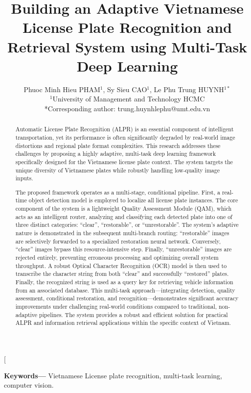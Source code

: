 \documentclass[a4paper,11pt,twocolumn]{article}
\title{\bfseries Building an Adaptive Vietnamese License Plate Recognition and Retrieval System using Multi-Task Deep Learning}
\author{
	Phuoc Minh Hieu PHAM$^{1}$, Sy Sieu CAO$^{1}$, Le Phu Trung HUYNH$^{1*}$\\
	$^{1}$University of Management and Technology HCMC\\[4pt]
	*Corresponding author: trung.huynhlephu@umt.edu.vn
}
\date{}
\begin{document}
	
	\twocolumn[
	\maketitle
	
	\begin{abstract}
		Automatic License Plate Recognition (ALPR) is an essential component of intelligent transportation, yet its performance is often significantly degraded by real-world image distortions and regional plate format complexities. This research addresses these challenges by proposing a highly adaptive, multi-task deep learning framework specifically designed for the Vietnamese license plate context. The system targets the unique diversity of Vietnamese plates while robustly handling low-quality image inputs.
		
		The proposed framework operates as a multi-stage, conditional pipeline. First, a real-time object detection model is employed to localize all license plate instances. The core component of the system is a lightweight Quality Assessment Module (QAM), which acts as an intelligent router, analyzing and classifying each detected plate into one of three distinct categories: ``clear'', ``restorable'', or ``unrestorable''. The system's adaptive nature is demonstrated in the subsequent multi-branch routing: ``restorable'' images are selectively forwarded to a specialized restoration neural network. Conversely, ``clear'' images bypass this resource-intensive step. Finally, ``unrestorable'' images are rejected entirely, preventing erroneous processing and optimizing overall system throughput. A robust Optical Character Recognition (OCR) model is then used to transcribe the character string from both ``clear'' and successfully ``restored'' plates. Finally, the recognized string is used as a query key for retrieving vehicle information from an associated database. This multi-task approach—integrating detection, quality assessment, conditional restoration, and recognition—demonstrates significant accuracy improvements under challenging real-world conditions compared to traditional, non-adaptive pipelines. The system provides a robust and efficient solution for practical ALPR and information retrieval applications within the specific context of Vietnam.
	\end{abstract}
	
	\vspace{0.5em}
	\noindent\textbf{\small Keywords—} Vietnamese License plate recognition, multi-task learning, computer vision.
	
\end{document}
